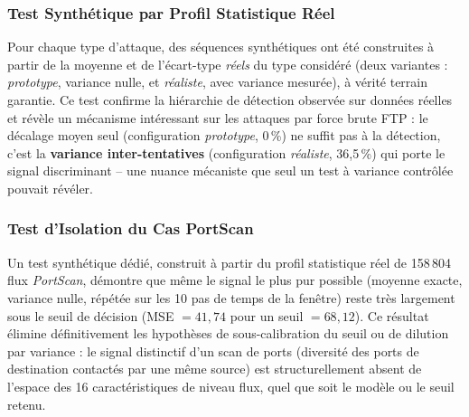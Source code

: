 \subsubsection{Test Synthétique par Profil Statistique Réel}
Pour chaque type d'attaque, des séquences synthétiques ont été construites à partir de la moyenne et de l'écart-type \textit{réels} du type considéré (deux variantes : \textit{prototype}, variance nulle, et \textit{réaliste}, avec variance mesurée), à vérité terrain garantie. Ce test confirme la hiérarchie de détection observée sur données réelles et révèle un mécanisme intéressant sur les attaques par force brute FTP : le décalage moyen seul (configuration \textit{prototype}, 0\,\%) ne suffit pas à la détection, c'est la \textbf{variance inter-tentatives} (configuration \textit{réaliste}, 36,5\,\%) qui porte le signal discriminant -- une nuance mécaniste que seul un test à variance contrôlée pouvait révéler.

\subsubsection{Test d'Isolation du Cas PortScan}
Un test synthétique dédié, construit à partir du profil statistique réel de 158\,804 flux \textit{PortScan}, démontre que même le signal le plus pur possible (moyenne exacte, variance nulle, répétée sur les 10 pas de temps de la fenêtre) reste très largement sous le seuil de décision (MSE $=41,74$ pour un seuil $=68,12$). Ce résultat élimine définitivement les hypothèses de sous-calibration du seuil ou de dilution par variance : le signal distinctif d'un scan de ports (diversité des ports de destination contactés par une même source) est structurellement absent de l'espace des 16 caractéristiques de niveau flux, quel que soit le modèle ou le seuil retenu.


